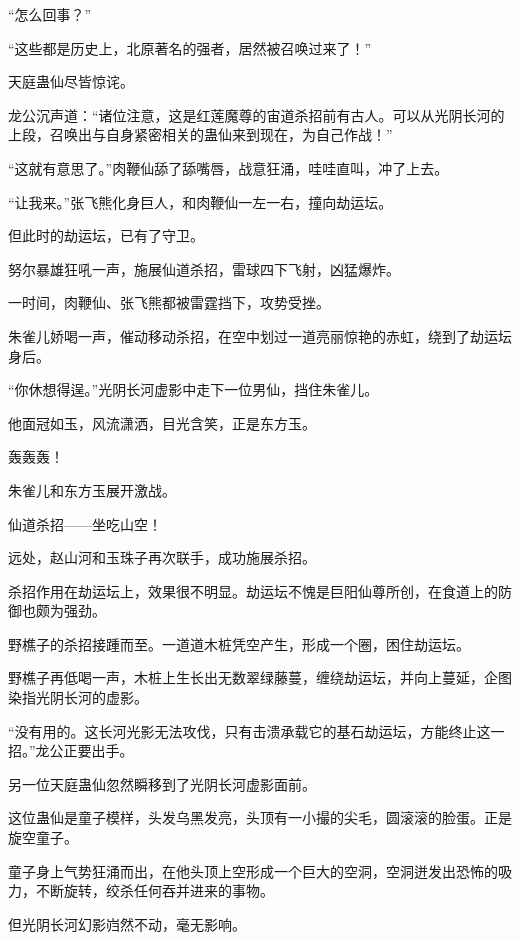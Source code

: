 
\begin{this_body}

“怎么回事？”

“这些都是历史上，北原著名的强者，居然被召唤过来了！”

天庭蛊仙尽皆惊诧。

龙公沉声道：“诸位注意，这是红莲魔尊的宙道杀招前有古人。可以从光阴长河的上段，召唤出与自身紧密相关的蛊仙来到现在，为自己作战！”

“这就有意思了。”肉鞭仙舔了舔嘴唇，战意狂涌，哇哇直叫，冲了上去。

“让我来。”张飞熊化身巨人，和肉鞭仙一左一右，撞向劫运坛。

但此时的劫运坛，已有了守卫。

努尔暴雄狂吼一声，施展仙道杀招，雷球四下飞射，凶猛爆炸。

一时间，肉鞭仙、张飞熊都被雷霆挡下，攻势受挫。

朱雀儿娇喝一声，催动移动杀招，在空中划过一道亮丽惊艳的赤虹，绕到了劫运坛身后。

“你休想得逞。”光阴长河虚影中走下一位男仙，挡住朱雀儿。

他面冠如玉，风流潇洒，目光含笑，正是东方玉。

轰轰轰！

朱雀儿和东方玉展开激战。

仙道杀招——坐吃山空！

远处，赵山河和玉珠子再次联手，成功施展杀招。

杀招作用在劫运坛上，效果很不明显。劫运坛不愧是巨阳仙尊所创，在食道上的防御也颇为强劲。

野樵子的杀招接踵而至。一道道木桩凭空产生，形成一个圈，困住劫运坛。

野樵子再低喝一声，木桩上生长出无数翠绿藤蔓，缠绕劫运坛，并向上蔓延，企图染指光阴长河的虚影。

“没有用的。这长河光影无法攻伐，只有击溃承载它的基石劫运坛，方能终止这一招。”龙公正要出手。

另一位天庭蛊仙忽然瞬移到了光阴长河虚影面前。

这位蛊仙是童子模样，头发乌黑发亮，头顶有一小撮的尖毛，圆滚滚的脸蛋。正是旋空童子。

童子身上气势狂涌而出，在他头顶上空形成一个巨大的空洞，空洞迸发出恐怖的吸力，不断旋转，绞杀任何吞并进来的事物。

但光阴长河幻影岿然不动，毫无影响。


\end{this_body}
